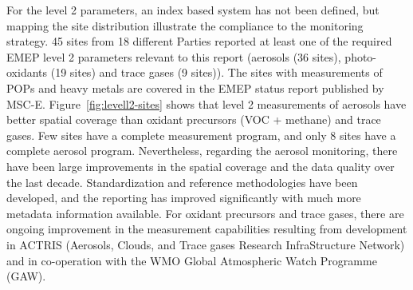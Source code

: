 For the level 2 parameters, an index based system has not been defined, but mapping the site distribution illustrate the 
compliance to the monitoring strategy. 45 sites from 18 different Parties reported  at least one of the required 
EMEP level 2 parameters relevant to this report (aerosols (36 sites), photo-oxidants (19 sites) and trace gases (9 sites)). 
The sites with measurements of POPs and heavy metals are covered in the EMEP status report published by MSC-E. 
Figure~\ref{fig:levell2-sites} shows that level 2 measurements of aerosols have better spatial coverage 
than oxidant precursors (VOC + methane) and trace gases. Few sites have a complete measurement program, 
and only 8 sites have a complete aerosol program. Nevertheless, regarding the aerosol monitoring, 
there have been large improvements in the spatial coverage and the data quality over the last decade. 
Standardization and reference methodologies have been developed, and the reporting has improved significantly 
with much more metadata information available. For oxidant precursors and trace gases, there are ongoing improvement in the measurement capabilities resulting from development in ACTRIS (Aerosols, Clouds, and Trace gases 
Research InfraStructure Network) and in co-operation with the WMO Global Atmospheric Watch Programme (GAW). 




\clearpage
\renewcommand\bibname{References}      %

